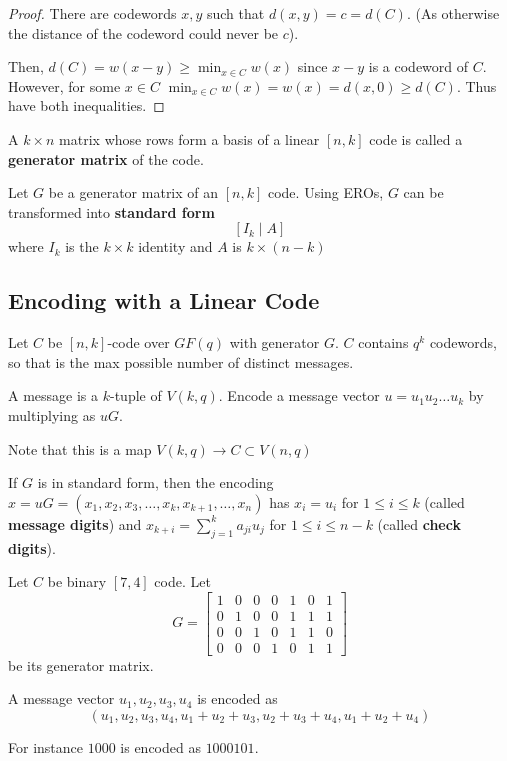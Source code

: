 \documentclass{article}
\begin{document}
\begin{proof}
  There are codewords \( x, y \) such that \( d(x, y) = c = d(C) \).
  (As otherwise the distance of the codeword could never be \( c \)).

  Then, \( d(C) = w(x - y) \ge \min_{x \in C}w(x) \) since \( x-y  \)
  is a codeword of \( C \). However, for some \( x \in C \)  \(
  \min_{x \in C}w(x) = w(x) = d(x, 0) \ge d(C)\). Thus have both inequalities.
\end{proof}
\begin{definition}
  A \( k \times n \) matrix whose rows form a basis of a linear \(
  [n, k] \) code is called a \textbf{generator matrix} of the code.
\end{definition}
\begin{theorem}
  Let \( G \) be a generator matrix of an \( [n, k] \) code. Using
  EROs, \( G \) can be transformed into \textbf{standard form} \[
    [I_k \mid A]
  \] where \( I_k \) is the \( k \times k  \) identity and \( A \) is \( k
  \times (n-k) \)
\end{theorem}
\subsection{Encoding with a Linear Code}
\begin{definition}
  Let \( C \) be \( [n, k] \)-code over \( GF(q) \) with generator \(
  G \). \( C \) contains \( q^k \) codewords, so that is the max
  possible number of distinct messages.

  A message is a \( k \)-tuple of \( V(k, q) \). Encode a message
  vector \( u = u_1 u_2 \dots u_k  \) by multiplying as \( uG \).

  Note that this is a map \( V(k, q) \to C \subset V(n, q) \)
\end{definition}
\begin{corollary}
  If \( G \) is in standard form, then the encoding \( x = uG = (x_1,
  x_2, x_3 ,\dots, x_k, x_{k+1}, \dots, x_n)  \) has \( x_i = u_i \)
  for \( 1 \le i \le k \) (called \textbf{message digits}) and \(
  x_{k+i} = \sum_{j=1}^k a_{ji}u_j\) for \( 1 \le i \le  n-k \)
  (called \textbf{check digits}).
\end{corollary}
\begin{example}
  Let \( C \) be binary \( [7, 4] \) code. Let \[
    G =
    \begin{bmatrix}
      1 & 0 & 0 & 0 & 1 & 0 & 1 \\
      0 & 1 & 0 & 0 & 1 & 1 & 1 \\
      0 & 0 & 1 & 0 & 1 & 1 & 0 \\
      0 & 0 & 0 & 1 & 0 & 1 & 1
    \end{bmatrix}
  \] be its generator matrix.

  A message vector \( u_1, u_2, u_3, u_4 \) is encoded as \[
    (u_1, u_2, u_3, u_4, u_1 + u_2 + u_3, u_2 + u_3 + u_4, u_1 + u_2 + u_4)
  \]

  For instance \( 1000 \) is encoded as \( 1000101 \).
\end{example}
\end{document}
